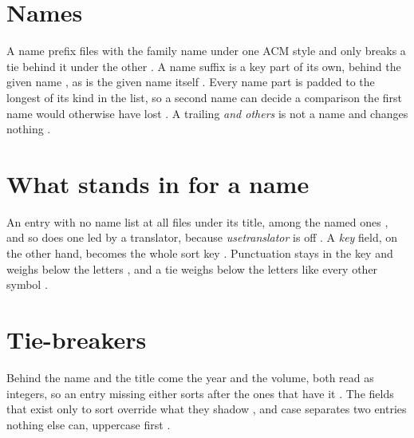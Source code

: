 \documentclass[acmsmall,nonacm,natbib=false]{acmart}
\begin{document}
\thispagestyle{empty}

\section*{Names}
A name prefix files with the family name under one ACM style and only breaks a tie behind it under the other \cite{PfBachman,PfBeethoven,PfBergAl,PfBergJan,PfBergVan,PfValois,PfZorn,PfVallee}.
A name suffix is a key part of its own, behind the given name \cite{SfKing,SfKingJr,SfKingSr}, as is the given name itself \cite{GvNone,GvAl,GvAlan}.
Every name part is padded to the longest of its kind in the list, so a second name can decide a comparison the first name would otherwise have lost \cite{PdTwo,PdOne,PdFamB,PdFamA}.
A trailing \emph{and others} is not a name and changes nothing \cite{OtOthers,OtSolo,OtPine}.

\section*{What stands in for a name}
An entry with no name list at all files under its title, among the named ones \cite{NlAardvark,NlLee,NlMiddle,NlNoe,NlYar,NlZebra}, and so does one led by a translator, because \emph{usetranslator} is off \cite{RlTranslator}.
A \emph{key} field, on the other hand, becomes the whole sort key \cite{KyAaa,KyZzz}.
Punctuation stays in the key and weighs below the letters \cite{PnPlain,PnQuote}, and a tie weighs below the letters like every other symbol \cite{TiTilde}.

\section*{Tie-breakers}
Behind the name and the title come the year and the volume, both read as integers, so an entry missing either sorts after the ones that have it \cite{YrEarly,YrLate,YrNone} \cite{VlNone,VlTwo,VlRoman,VlTen,VlWord} \cite{IsNeg,IsOne,IsZero,IsWord}.
The fields that exist only to sort override what they shadow \cite{OvPresort,OvSorttitle,OvSortname,OvSortyear,OvPlainyear}, and case separates two entries nothing else can, uppercase first \cite{CsUpper,CsLower}.

\printbibliography
\end{document}
